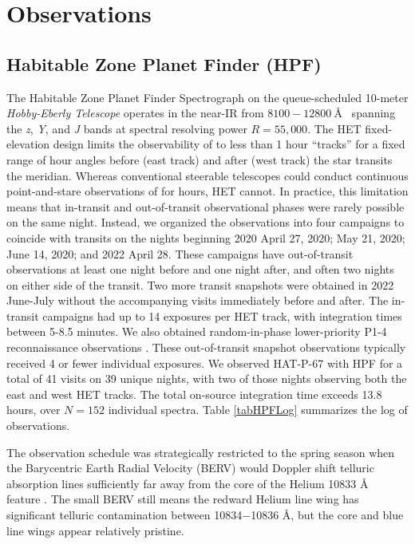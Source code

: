 \documentclass[twocolumn]{aastex631}
\begin{document}
\section{Observations}\label{secObs}
\subsection{Habitable Zone Planet Finder (HPF)}

The Habitable Zone Planet Finder Spectrograph \citep[HPF;][]{2012SPIE.8446E..1SM,2014SPIE.9147E..1GM, 2019Optic...6..233M} on the queue-scheduled 10-meter \emph{Hobby-Eberly Telescope} \citep[HET;][]{1998SPIE.3352...34R} operates in the near-IR from $8100-12800~$\AA~ spanning the \textit{z}, \textit{Y}, and \textit{J} bands at spectral resolving power $R=55,000$. The HET fixed-elevation design \citep{2007PASP..119..556S} limits the observability of  to less than 1 hour ``tracks'' for a fixed range of hour angles before (east track) and after (west track) the star transits the meridian.  Whereas conventional steerable telescopes could conduct continuous point-and-stare observations of  for hours, HET cannot.  In practice, this limitation means that in-transit and out-of-transit observational phases were rarely possible on the same night.  Instead, we organized the observations into four campaigns to coincide with  transits on the nights beginning 2020 April 27, 2020; May 21, 2020; June 14, 2020; and 2022 April 28.  These campaigns have out-of-transit observations at least one night before and one night after, and often two nights on either side of the transit.  Two more transit snapshots were obtained in 2022 June-July without the accompanying visits immediately before and after.  The in-transit campaigns had up to 14 exposures per HET track, with integration times between 5-8.5 minutes.  We also obtained random-in-phase lower-priority P1-4 reconnaissance observations \citep{2007PASP..119..556S}.  These out-of-transit snapshot observations typically received 4 or fewer individual exposures.  We observed HAT-P-67 with HPF for a total of 41 visits on 39 unique nights, with two of those nights observing both the east and west HET tracks.  The total on-source integration time exceeds 13.8 hours, over $N=152$ individual spectra.  Table \ref{tabHPFLog} summarizes the log of observations.

The observation schedule was strategically restricted to the spring season when the Barycentric Earth Radial Velocity (BERV) would Doppler shift telluric absorption lines sufficiently far away from the core of the Helium 10833 \AA~ feature \citep{2022ApJ...939L..11S}.  The small BERV still means the redward Helium line wing has significant telluric contamination between 10834$-$10836 \AA, but the core and blue line wings appear relatively pristine.
\end{document}
